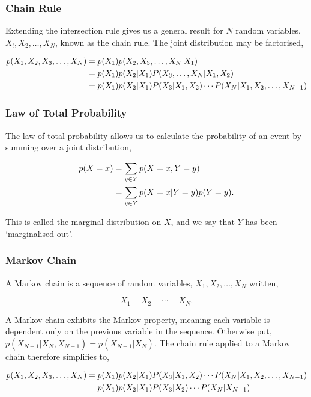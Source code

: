 \documentclass[11pt]{amsart}
\begin{document}
\subsubsection{Chain Rule}

Extending the intersection rule gives us a general result for $N$ random variables, $X_!, X_2, \dots, X_N$, known as the chain rule. The joint distribution may be factorised,

\begin{align}
p(X_1, X_2, X_3,\dots,X_N) &= p(X_1)p(X_2, X_3, \dots, X_N|X_1) \notag \\
&= p(X_1)p(X_2|X_1)P(X_3, \dots, X_N|X_1, X_2) \notag \\
&= p(X_1)p(X_2|X_1)P(X_3|X_1, X_2)\cdots P(X_N|X_1, X_2, \dots, X_{N-1}) \notag
\end{align}

\subsubsection{Law of Total Probability}

The law of total probability allows us to calculate the probability of an event by summing over a joint distribution,

\begin{align}
p(X=x) &= \sum_{y \in Y} p(X=x, Y=y) \notag \\
&= \sum_{y \in Y} p(X=x|Y=y)p(Y=y). \notag
\end{align}

This is called the marginal distribution on $X$, and we say that $Y$ has been `marginalised out'.

\subsubsection{Markov Chain}
A Markov chain is a sequence of random variables, $X_1, X_2, \dots, X_N$ written,

$$X_1 - X_2 - \cdots - X_N.$$

A Markov chain exhibits the Markov property, meaning each variable is dependent only on the previous variable in the sequence. Otherwise put, $p(X_{N+1}|X_N, X_{N-1}) = p(X_{N+1}|X_N)$. The chain rule applied to a Markov chain therefore simplifies to,

\begin{align}
p(X_1, X_2, X_3,\dots,X_N) &= p(X_1)p(X_2|X_1)P(X_3|X_1, X_2)\cdots P(X_N|X_1, X_2, \dots, X_{N-1}) \notag \\
 &= p(X_1)p(X_2|X_1)P(X_3|X_2)\cdots P(X_N|X_{N-1}) \notag
\end{align}
\end{document}
